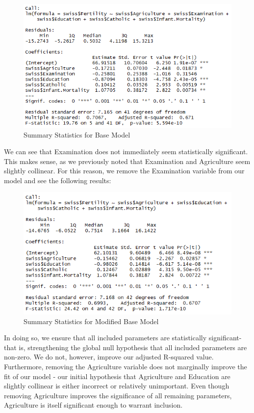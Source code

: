 \documentclass[preprint,12pt]{elsarticle}
\begin{document}
\begin{figure}[h!]
\centering\includegraphics[width=0.7\linewidth]{SummaryBaseModel}
\caption{Summary Statistics for Base Model}
\end{figure}

\noindent We can see that Examination does not immediately seem statistically significant. This makes sense, as we previously noted that Examination and Agriculture seem slightly collinear. For this reason, we remove the Examination variable from our model and see the following results:


\begin{figure}[h!]
\centering\includegraphics[width=0.7\linewidth]{SummaryStatsDenom}
\caption{Summary Statistics for Modified Base Model}
\end{figure}

\noindent In doing so, we ensure that all included parameters are statistically significant- that is, strengthening the global null hypothesis that all included parameters are non-zero. We do not, however, improve our adjusted R-squared value. Furthermore, removing the Agriculture variable does not marginally improve the fit of our model - our initial hypothesis that Agriculture and Education are slightly collinear is either incorrect or relatively unimportant. Even though removing Agriculture improves the significance of all remaining parameters, Agriculture is itself significant enough to warrant inclusion. \\
\end{document}
